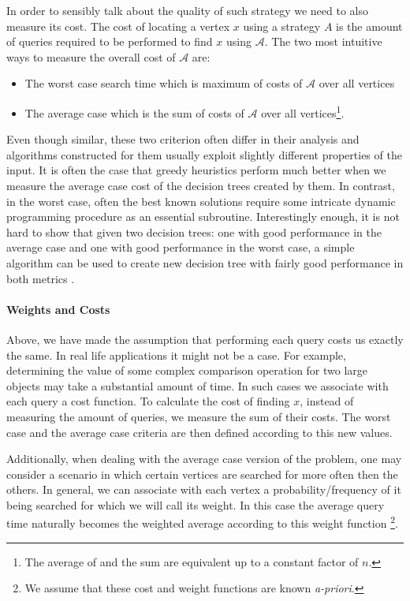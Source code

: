 In order to sensibly talk about the quality of such strategy we need to also measure its cost. The cost of locating a vertex $x$ using a strategy $A$ is the amount of queries required to be performed to find $x$ using $\mathcal{A}$. The two most intuitive ways to measure the overall cost of $\mathcal{A}$ are: 
\begin{itemize}
    \item The worst case search time which is maximum of costs of $\mathcal{A}$ over all vertices
    \item The average case which is the sum of costs of $\mathcal{A}$ over all vertices\footnote{The average of and the sum are equivalent up to a constant factor of $n$.}.
\end{itemize}

Even though similar, these two criterion often differ in their analysis and algorithms constructed for them usually exploit slightly different properties of the input. It is often the case that greedy heuristics perform much better when we measure the average case cost of the decision trees created by them. In contrast, in the worst case, often the best known solutions require some intricate dynamic programming procedure as an essential subroutine. Interestingly enough, it is not hard to show that given two decision trees: one with good performance in the average case and one with good performance in the worst case, a simple algorithm can be used to create new decision tree with fairly good performance in both metrics \cite{Tradingoff}.

\paragraph{Weights and Costs}
Above, we have made the assumption that performing each query costs us exactly the same. In real life applications it might not be a case. For example, determining the value of some complex comparison operation for two large objects may take a substantial amount of time. In such cases we associate with each query a cost function. To calculate the cost of finding $x$, instead of measuring the amount of queries, we measure the sum of their costs. The worst case and the average case criteria are then defined according to this new values. 

Additionally, when dealing with the average case version of the problem, one may consider a scenario in which certain vertices are searched for more often then the others. In general, we can associate with each vertex a probability/frequency of it being searched for which we will call its weight. In this case the average query time naturally becomes the weighted average according to this weight function \footnote{We assume that these cost and weight functions are known \textit{a-priori}.}.

